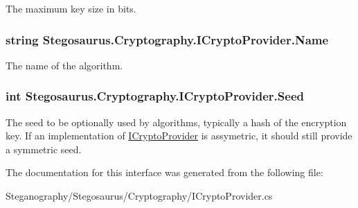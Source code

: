 The maximum key size in bits. 

\subsubsection[{\texorpdfstring{Name}{Name}}]{\setlength{\rightskip}{0pt plus 5cm}string Stegosaurus.\+Cryptography.\+I\+Crypto\+Provider.\+Name\hspace{0.3cm}{\ttfamily [get]}}\hypertarget{interface_stegosaurus_1_1_cryptography_1_1_i_crypto_provider_a9b2e3db9ac5f22d5c30d5f1877e18bbb}{}\label{interface_stegosaurus_1_1_cryptography_1_1_i_crypto_provider_a9b2e3db9ac5f22d5c30d5f1877e18bbb}


The name of the algorithm. 

\subsubsection[{\texorpdfstring{Seed}{Seed}}]{\setlength{\rightskip}{0pt plus 5cm}int Stegosaurus.\+Cryptography.\+I\+Crypto\+Provider.\+Seed\hspace{0.3cm}{\ttfamily [get]}}\hypertarget{interface_stegosaurus_1_1_cryptography_1_1_i_crypto_provider_acbb21695dbfa48878dda20f5159bc60b}{}\label{interface_stegosaurus_1_1_cryptography_1_1_i_crypto_provider_acbb21695dbfa48878dda20f5159bc60b}


The seed to be optionally used by algorithms, typically a hash of the encryption key. If an implementation of \hyperlink{interface_stegosaurus_1_1_cryptography_1_1_i_crypto_provider}{I\+Crypto\+Provider} is assymetric, it should still provide a symmetric seed. 



The documentation for this interface was generated from the following file\+:\begin{DoxyCompactItemize}
\item 
Steganography/\+Stegosaurus/\+Cryptography/I\+Crypto\+Provider.\+cs\end{DoxyCompactItemize}
